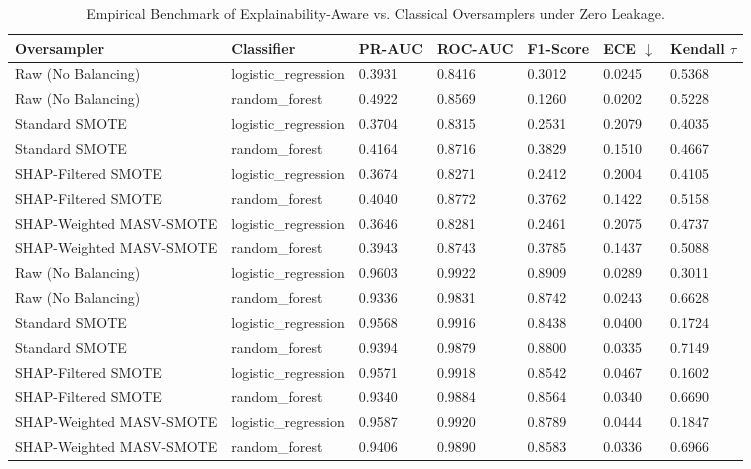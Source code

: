 \begin{table}[htbp]
\centering
\caption{Empirical Benchmark of Explainability-Aware vs. Classical Oversamplers under Zero Leakage.}
\label{tab:empirical_benchmarks}
\begin{tabular}{lllllll}
\toprule
Oversampler & Classifier & PR-AUC & ROC-AUC & F1-Score & ECE $\downarrow$ & Kendall $\tau$ \\
\midrule
Raw (No Balancing) & logistic_regression & 0.3931 & 0.8416 & 0.3012 & 0.0245 & 0.5368 \\
Raw (No Balancing) & random_forest & 0.4922 & 0.8569 & 0.1260 & 0.0202 & 0.5228 \\
Standard SMOTE & logistic_regression & 0.3704 & 0.8315 & 0.2531 & 0.2079 & 0.4035 \\
Standard SMOTE & random_forest & 0.4164 & 0.8716 & 0.3829 & 0.1510 & 0.4667 \\
SHAP-Filtered SMOTE & logistic_regression & 0.3674 & 0.8271 & 0.2412 & 0.2004 & 0.4105 \\
SHAP-Filtered SMOTE & random_forest & 0.4040 & 0.8772 & 0.3762 & 0.1422 & 0.5158 \\
SHAP-Weighted MASV-SMOTE & logistic_regression & 0.3646 & 0.8281 & 0.2461 & 0.2075 & 0.4737 \\
SHAP-Weighted MASV-SMOTE & random_forest & 0.3943 & 0.8743 & 0.3785 & 0.1437 & 0.5088 \\
Raw (No Balancing) & logistic_regression & 0.9603 & 0.9922 & 0.8909 & 0.0289 & 0.3011 \\
Raw (No Balancing) & random_forest & 0.9336 & 0.9831 & 0.8742 & 0.0243 & 0.6628 \\
Standard SMOTE & logistic_regression & 0.9568 & 0.9916 & 0.8438 & 0.0400 & 0.1724 \\
Standard SMOTE & random_forest & 0.9394 & 0.9879 & 0.8800 & 0.0335 & 0.7149 \\
SHAP-Filtered SMOTE & logistic_regression & 0.9571 & 0.9918 & 0.8542 & 0.0467 & 0.1602 \\
SHAP-Filtered SMOTE & random_forest & 0.9340 & 0.9884 & 0.8564 & 0.0340 & 0.6690 \\
SHAP-Weighted MASV-SMOTE & logistic_regression & 0.9587 & 0.9920 & 0.8789 & 0.0444 & 0.1847 \\
SHAP-Weighted MASV-SMOTE & random_forest & 0.9406 & 0.9890 & 0.8583 & 0.0336 & 0.6966 \\
\bottomrule
\end{tabular}
\end{table}
